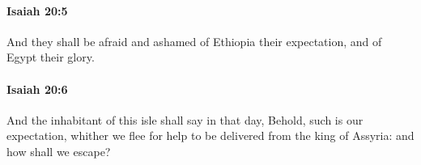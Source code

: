 		\paragraph{Isaiah 20:5} %
			\label{ISAIAH-20-5}

			And they shall be afraid and ashamed of Ethiopia their expectation, and of Egypt their glory.


		\paragraph{Isaiah 20:6} %
			\label{ISAIAH-20-6}

			And the inhabitant of this isle shall say in that day, Behold, such is our expectation, whither we flee for help to be delivered from the king of Assyria: and how shall we escape?

